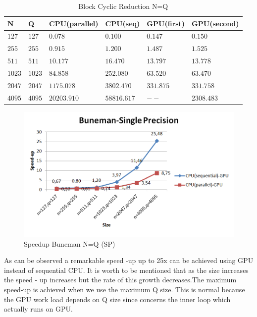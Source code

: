    \begin{table}[H]
\caption{Block Cyclic Reduction N=Q} 
\centering 
\begin{tabular}{| l |  p{1cm} |p{}| p{} |  p{}| p{} | } 
\hline\hline 
N & Q & CPU(parallel) & CPU(seq) & GPU(first)  & GPU(second) \\ [0.8ex] 
\hline
$127$ &	$127$ & $0.078$	&	$0.100$ & $0.147$ & $0.150$ \\
$255$ &	$255$ & $0.915$	&	$1.200$ & $1.487$ & $1.525$ \\
$511$ &	$511$ & $10.177$	&	$16.470$ & $13.797$ & $13.778$ \\
$1023$ &	$1023$ & $84.858$	&	$252.080$ & $63.520$ & $63.470$ \\
$2047$ &	$2047$ & $1175.078$	&	$3802.470$ & $331.875$ & $331.758$ \\
$4095$ & $4095$  & $20203.910$	&  $58816.617$ & $--$ & $2308.483$ \\[1ex]
\hline 
\end{tabular}
\label{table:bcr_n=q} 
\end{table} 

\begin{figure}[H]
   \centering
       \includegraphics[width=1\textwidth]{grafhmata/buneman_sp_speedup_nq.png}
   \caption{Speedup Buneman N=Q (SP)}
   \label{fig:Speedup Buneman N=Q (SP)}
\end{figure}

As can be observed a remarkable speed -up up to 25x can be achieved using GPU instead of sequential CPU.
It is worth to be mentioned that as the size increases the speed - up increases but the rate of this growth
decreases.The maximum speed-up is achieved when we use the maximum Q size. This is normal because the GPU work load depends on Q size since concerns the inner loop which actually runs on GPU.

